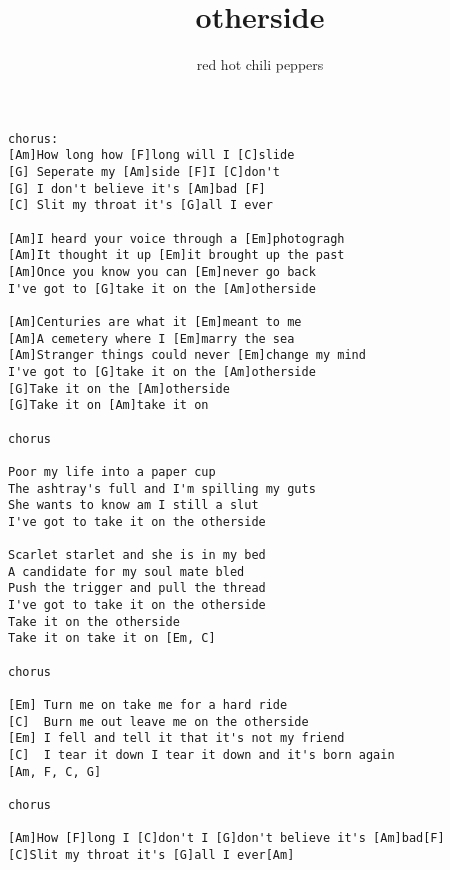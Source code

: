 \author{red hot chili peppers}
\title{otherside}
\maketitle
\begin{verbatim}
chorus:
[Am]How long how [F]long will I [C]slide
[G] Seperate my [Am]side [F]I [C]don't
[G] I don't believe it's [Am]bad [F]
[C] Slit my throat it's [G]all I ever

[Am]I heard your voice through a [Em]photogragh
[Am]It thought it up [Em]it brought up the past
[Am]Once you know you can [Em]never go back 
I've got to [G]take it on the [Am]otherside

[Am]Centuries are what it [Em]meant to me
[Am]A cemetery where I [Em]marry the sea
[Am]Stranger things could never [Em]change my mind
I've got to [G]take it on the [Am]otherside
[G]Take it on the [Am]otherside
[G]Take it on [Am]take it on

chorus
 
Poor my life into a paper cup
The ashtray's full and I'm spilling my guts
She wants to know am I still a slut  
I've got to take it on the otherside

Scarlet starlet and she is in my bed
A candidate for my soul mate bled
Push the trigger and pull the thread
I've got to take it on the otherside
Take it on the otherside
Take it on take it on [Em, C]

chorus

[Em] Turn me on take me for a hard ride
[C]  Burn me out leave me on the otherside
[Em] I fell and tell it that it's not my friend 
[C]  I tear it down I tear it down and it's born again
[Am, F, C, G]

chorus

[Am]How [F]long I [C]don't I [G]don't believe it's [Am]bad[F]
[C]Slit my throat it's [G]all I ever[Am]
\end{verbatim}